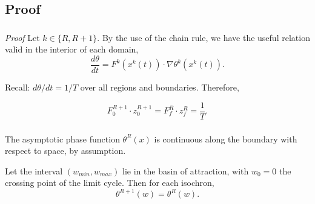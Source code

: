 \documentclass{beamer}
\begin{document}
\subsection{Proof}
\begin{frame}
\frametitle{\insertsection}
\framesubtitle{\insertsubsection}
\textit{Proof} Let $k \in \{ R, R+1 \}$.  By the use of the chain rule, we have the useful relation valid in the interior of each domain,
\begin{equation}
 \frac{d\theta}{dt}=F^k(x^k(t))\cdot\nabla\theta^k(x^k(t)).
\end{equation}

Recall: $d\theta/dt = 1/T$ over all regions and boundaries.  Therefore,

\begin{equation}\label{eq:thetaflow}
F_0^{R+1}\cdot z_0^{R+1}=F_f^{R}\cdot z_f^{R}=\frac{1}{T}.
\end{equation}
\end{frame}




\begin{frame}
\frametitle{\insertsection}
\framesubtitle{\insertsubsection}
The asymptotic phase function $\theta^R(x)$ is continuous along the boundary with respect to space, by assumption.

Let the interval $(w_{min},w_{max})$ lie in the basin of attraction, with $w_0=0$ the crossing point of the limit cycle.  Then for each isochron,
\begin{equation}
\theta^{R+1}(w) = \theta^R(w).
\end{equation}
\end{frame}
\end{document}
